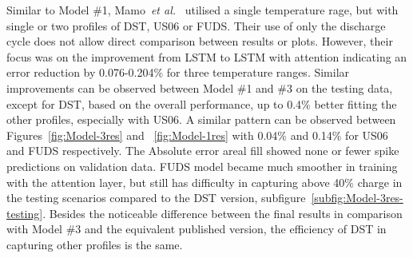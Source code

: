 %
%
Similar to Model \#1, Mamo~\textit{et al.}~\cite{mamo_long_2020} utilised a single temperature rage, but with single or two profiles of DST, US06 or FUDS.
Their use of only the discharge cycle does not allow direct comparison between results or plots.
However, their focus was on the improvement from LSTM to LSTM with attention indicating an error reduction by 0.076-0.204\% for three temperature ranges.
Similar improvements can be observed between Model \#1 and \#3 on the testing data, except for DST, based on the overall performance, up to 0.4\% better fitting the other profiles, especially with US06.
A similar pattern can be observed between Figures~\ref{fig:Model-3res} and ~\ref{fig:Model-1res} with 0.04\% and 0.14\% for US06 and FUDS respectively.
The Absolute error areal fill showed none or fewer spike predictions on validation data.
FUDS model became much smoother in training with the attention layer, but still has difficulty in capturing above 40\% charge in the testing scenarios compared to the DST version, subfigure~\ref{subfig:Model-3res-testing}. 
Besides the noticeable difference between the final results in comparison with Model \#3 and the equivalent published version, the efficiency of DST in capturing other profiles is the same.

